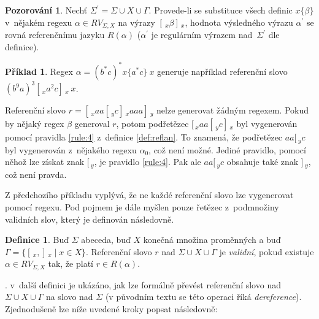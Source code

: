 \documentclass[thesis=B,czech]{FITthesis}[2019/12/23]
\theoremstyle{definition}
\newtheorem{definition}{Definice}[chapter]
\newtheorem{example}{Příklad}[chapter]
\newtheorem{pozorovani}{Pozorování}[chapter]
\begin{document}
\begin{pozorovani}\label{poz:hodnota}
Nechť $\Sigma^\prime = \Sigma \cup X \cup \Gamma$. Provede-li se substituce všech definic $x \{ \beta \}$ v~nějakém regexu $\alpha \in RV_{\Sigma, X}$ na výrazy $[\,_x \beta ]\,_x$, hodnota výsledného výrazu $\alpha^\prime$ se rovná referenčnímu jazyku $R(\alpha)$ ($\alpha^\prime$ je regulárním výrazem nad~$\Sigma^\prime$ dle definice). \cite[s. 4]{fsdeter}
\end{pozorovani}

\begin{example} 
Regex $\alpha = \left( b^\ast c \right)^\ast x \{ a^\ast c \} \ x $ generuje například referenční slovo $\left(b^9a\right)^3 [\,_x a^2 c ]\,_x \ x$.

Referenční slovo $r = [\,_x aa  [\,_y c ]\,_x aaa ]\,_y$ nelze generovat žádným regexem. Pokud by nějaký regex $\beta$ generoval $r$, potom podřetězec  $[\,_x aa  [\,_y c ]\,_x$ byl vygenerován pomocí pravidla \ref{rule:4} z~definice \ref{def:reflan}. To znamená, že podřetězec $aa  [\,_y c$  byl vygenerován z~nějakého regexu $\alpha_0$, což není možné. Jediné pravidlo, pomocí něhož lze získat znak $[\,_y$, je pravidlo \ref{rule:4}. Pak ale $aa  [\,_y c$ obsahuje také znak $]\,_y$, což není pravda.
\end{example}

Z předchozího příkladu vyplývá, že ne každé referenční slovo lze vygenerovat pomocí regexu. Pod pojmem  je dále myšlen pouze řetězec z~podmnožiny validních slov, který je definován následovně.

\begin{definition}
Buď $\Sigma$ abeceda, buď $X$ konečná množina proměnných a buď $\Gamma = \{ [\,_x , ]\,_x \mid x \in X \}$. Referenční slovo $r$ nad $\Sigma \cup X \cup \Gamma$  je \emph{validní}, pokud existuje $\alpha \in RV_{\Sigma, X}$ tak, že platí $r \in R\left(\alpha\right)$.
\end{definition}

. \cite{fsdeter} v~další definici je ukázáno, jak lze formálně převést referenční slovo nad $\Sigma \cup X \cup \Gamma$ na slovo nad $\Sigma$ (v původním textu se této operaci říká \emph{dereference}). Zjednodušeně lze níže uvedené kroky popsat následovně:
   
\end{document}

